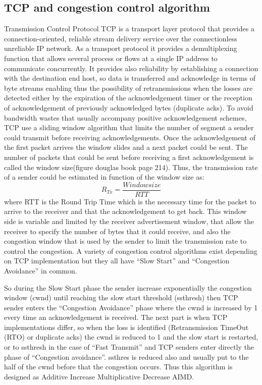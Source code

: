 \subsection{TCP and congestion control algorithm}
Transmission Control Protocol TCP is a transport layer protocol that provides a connection-oriented, reliable stream delivery service over the connectionless unreliable IP network. As a transport protocol it provides a demultiplexing function that allows several process or flows at a single IP address to communicate concurrently. It provides also reliability by establishing a connection with the destination end host, so data is transferred and acknowledge in terms of byte streams enabling thus the possibility of retransmissions when the losses are detected either by the expiration of the acknowledgement timer or the reception of acknowledgement of previously acknowledged bytes (duplicate acks).
To avoid bandwidth wastes that usually accompany positive acknowledgement schemes, TCP use a sliding window algorithm that limits the number of segment a sender could transmit before receiving acknowledgements. Once the acknowledgement of the first packet arrives the window slides and a next packet could be sent. The number of packets that could be sent before receiving a first acknowledgement is called the window size(figure douglas book page 214). Thus, the transmission rate of a sender could be estimated in function of the window size as:
\begin{equation}
R_{Tx} = \frac{Window size}{RTT}
\end{equation}
where RTT is the Round Trip Time which is the necessary time for the packet to arrive to the receiver and that the acknowledgement to get back. This window side is variable and limited by the receiver advertisement window, that allow the receiver to specify the number of bytes that it could receive, and also the congestion window that is used by the sender to limit the transmission rate to control the congestion. A variety of congestion control algorithms exist depending on TCP implementation but they all have “Slow Start” and “Congestion Avoidance” in common. 

So during the Slow Start phase the sender increase exponentially the congestion window (cwnd) until reaching the slow start threshold (ssthresh) then TCP sender enters the “Congestion Avoidance” phase where the cwnd is increased by 1 every time an acknowledgement is received.
The next part is when TCP implementations differ, so when the loss is identified (Retransmission TimeOut (RTO) or duplicate acks) the cwnd is reduced to 1 and the slow start is restarted, or to ssthresh in the case of “Fast Transmit” and TCP senders enter directly the phase of  “Congestion avoidance”. ssthres is reduced also and usually put to the half of the cwnd before that the congestion occurs. Thus this algorithm is designed as Additive Increase Multiplicative Decrease AIMD. 

